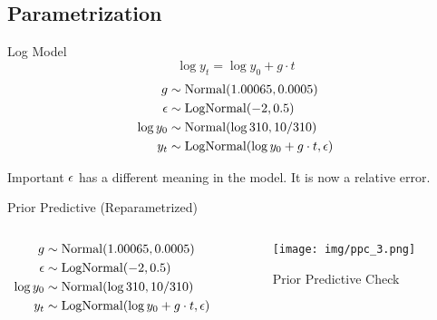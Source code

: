 \documentclass{beamer}
\begin{document}
\subsection{Parametrization}
\begin{frame}{Log Model}
    \begin{equation*}
    \log y_t = \log y_0 + g \cdot t
    \end{equation*}
    \begin{align*}
        g &\sim \operatorname{Normal}(1.00065, 0.0005)\\
        {\epsilon} &\sim \operatorname{LogNormal}(-2, 0.5)\\
        \log y_0 &\sim \operatorname{Normal}(\log 310, 10/310)\\
        y_t & \sim \operatorname{LogNormal}(\log y_0 + g \cdot t, {\epsilon})
    \end{align*}
\begin{alertblock}{Important}
    ${\epsilon}$ has a different meaning in the model. It is now a relative error.
\end{alertblock}
\end{frame}
\begin{frame}{Prior Predictive (Reparametrized)}
    \begin{columns}
    \begin{column}{0.5\linewidth}
    \begin{align*}
        g &\sim \operatorname{Normal}(1.00065, 0.0005)\\
        {\epsilon} &\sim \operatorname{LogNormal}(-2, 0.5)\\
        \log y_0 &\sim \operatorname{Normal}(\log 310, 10/310)\\
        y_t & \sim \operatorname{LogNormal}(\log y_0 + g \cdot t, {\epsilon})
    \end{align*}
    \end{column}
    \begin{column}{0.5\linewidth}
    \begin{figure}
        \centering
        \texttt{[image: img/ppc\_3.png]}
        \caption{Prior Predictive Check}
    \end{figure}
    \end{column}
\end{columns}
\end{frame}
\end{document}
